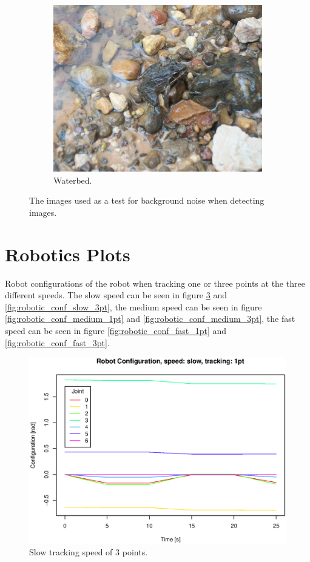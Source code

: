 \begin{figure}[h]
  \begin{subfigure}{\exampleWidth}  \includegraphics[width=\linewidth]{graphics/texture3} \caption{Waterbed.}         \label{fig:scene_waterb} \end{subfigure}
  \caption{The images used as a test for background noise when detecting images.}
  \label{fig:backgrounds}
\end{figure}

\section{Robotics Plots}
\label{app:roboticsPlots}

Robot configurations of the robot when tracking one or three points at the three different speeds.
The slow speed can be seen in figure \ref{fig:robotic_conf_slow_1pt} and \ref{fig:robotic_conf_slow_3pt}, 
the medium speed can be seen in figure \ref{fig:robotic_conf_medium_1pt} and \ref{fig:robotic_conf_medium_3pt},
the fast speed can be seen in figure \ref{fig:robotic_conf_fast_1pt} and \ref{fig:robotic_conf_fast_3pt}.

\begin{figure}[H]
\centering
\includegraphics[width= \fullImageWidth]{graphics/robotics/robotConfiguration_slow_1pt}
\caption{Slow tracking speed of 3 points.}
\label{fig:robotic_conf_slow_1pt}
\end{figure}


